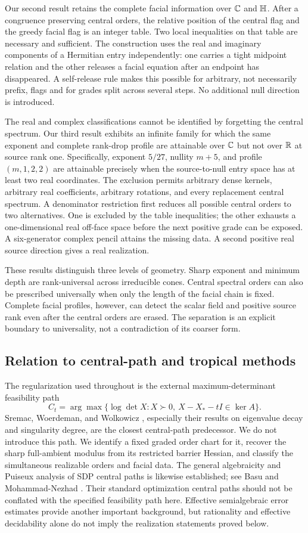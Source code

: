 Our second result retains the complete facial information over $\mathbb C$ and $\mathbb H$. After a congruence preserving central orders, the relative position of the central flag and the greedy facial flag is an integer table. Two local inequalities on that table are necessary and sufficient. The construction uses the real and imaginary components of a Hermitian entry independently: one carries a tight midpoint relation and the other releases a facial equation after an endpoint has disappeared. A self-release rule makes this possible for arbitrary, not necessarily prefix, flags and for grades split across several steps. No additional null direction is introduced.

The real and complex classifications cannot be identified by forgetting the central spectrum. Our third result exhibits an infinite family for which the same exponent and complete rank-drop profile are attainable over $\mathbb C$ but not over $\mathbb R$ at source rank one. Specifically, exponent $5/27$, nullity $m+5$, and profile $(m,1,2,2)$ are attainable precisely when the source-to-null entry space has at least two real coordinates. The exclusion permits arbitrary dense kernels, arbitrary real coefficients, arbitrary rotations, and every replacement central spectrum. A denominator restriction first reduces all possible central orders to two alternatives. One is excluded by the table inequalities; the other exhausts a one-dimensional real off-face space before the next positive grade can be exposed. A six-generator complex pencil attains the missing data. A second positive real source direction gives a real realization.

These results distinguish three levels of geometry. Sharp exponent and minimum depth are rank-universal across irreducible cones. Central spectral orders can also be prescribed universally when only the length of the facial chain is fixed. Complete facial profiles, however, can detect the scalar field and positive source rank even after the central orders are erased. The separation is an explicit boundary to universality, not a contradiction of its coarser form.

\subsection{Relation to central-path and tropical methods}
The regularization used throughout is the external maximum-determinant feasibility path
\[
C_t=\arg\max\{\log\det X:X\succ0,\ X-X_*-tI\in\ker A\}.
\]
Sremac, Woerdeman, and Wolkowicz \cite{SWW21}, especially their results on eigenvalue decay and singularity degree, are the closest central-path predecessor. We do not introduce this path. We identify a fixed graded order chart for it, recover the sharp full-ambient modulus from its restricted barrier Hessian, and classify the simultaneous realizable orders and facial data. The general algebraicity and Puiseux analysis of SDP central paths is likewise established; see Basu and Mohammad-Nezhad \cite{BMN22}. Their standard optimization central paths should not be conflated with the specified feasibility path here. Effective semialgebraic error estimates \cite{BMN24} provide another important background, but rationality and effective decidability alone do not imply the realization statements proved below.

